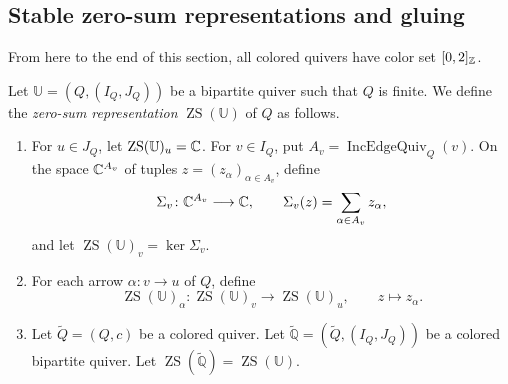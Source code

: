 \subsection{Stable zero-sum representations and gluing}
From here to the end of this section, all colored quivers have color set $[0,2]_{\mathbb Z}$.

\begin{definition}\label{def:reflected-block}
Let $\mathbb U=(Q,(I_Q,J_Q))$ be a bipartite quiver such that $Q$ is finite.
We define the \textit{zero-sum representation} $\operatorname{ZS}(\mathbb U)$ of $Q$ as follows.
\begin{enumerate}[font=\itshape]
\item\label{d:reflected-kernel} For $u\in J_{Q}$, let $\operatorname{ZS}(\mathbb U)_u=\mathbb C$.
For $v\in I_Q$, put $A_v=\operatorname{IncEdgeQuiv}_Q(v)$.
On the space $\mathbb C^{A_v}$ of tuples $z=(z_\alpha)_{\alpha\in A_v}$, define
\begin{equation}\label{eq:zero-sum-map}
 \Sigma_v\colon\mathbb C^{A_v}\longrightarrow\mathbb C,\qquad
 \Sigma_v(z)=\sum_{\alpha\in A_v}z_\alpha,
\end{equation}
and let $\operatorname{ZS}(\mathbb U)_v=\ker\Sigma_v$.
\item\label{d:reflected-projections} For each arrow $\alpha:v\to u$ of $Q$, define
\begin{equation}\label{eq:zero-sum-arrow}
 \operatorname{ZS}(\mathbb U)_\alpha\colon
 \operatorname{ZS}(\mathbb U)_v\longrightarrow\operatorname{ZS}(\mathbb U)_u,
 \qquad z\longmapsto z_\alpha.
\end{equation}
\item Let $\widetilde Q=(Q,c)$ be a colored quiver.
Let $\widetilde{\mathbb Q}=(\widetilde Q,(I_Q,J_Q))$ be a colored bipartite quiver.
Let $\operatorname{ZS}(\widetilde{\mathbb Q})=\operatorname{ZS}(\mathbb U)$.
\end{enumerate}
\end{definition}

